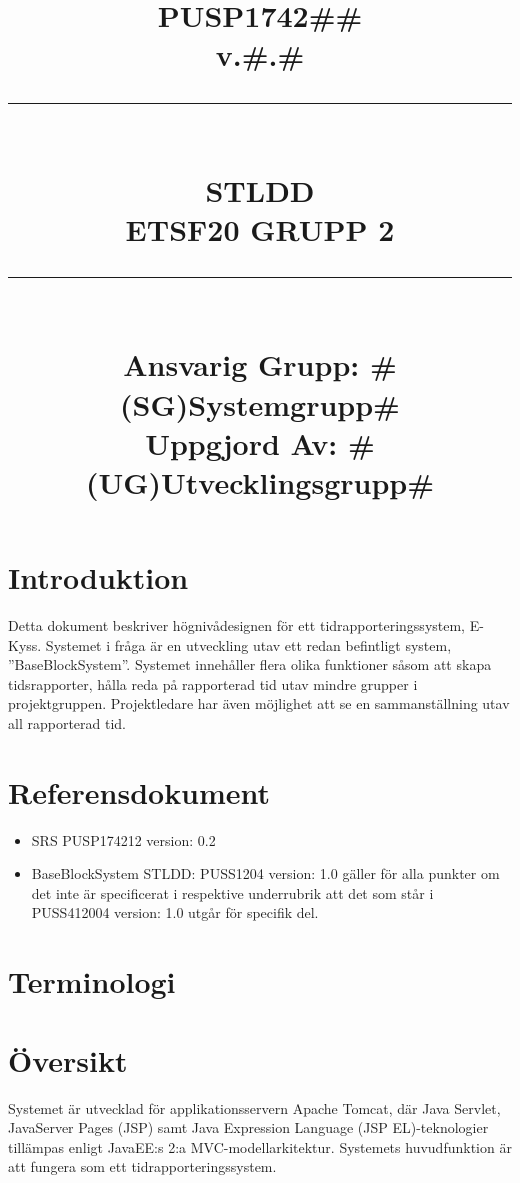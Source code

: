 \documentclass[paper=a4, fontsize=11pt,twoside]{article}
\title{
		\documentNumber{#1}																		
		\documentVersion{#2}																			
		\HRule{0.5pt} \\ %
		\LARGE \textbf{\uppercase{#3}} \\
		\large \textbf{\uppercase{ETSF20 Grupp 2}} 
		\HRule{2pt} \\ [1.5cm]    
		\normalsize            
		\documentResponsible{#4} \\ 
		\documentCreator{#5}  
	}
\newcommand{\HRule}[1]{\rule{\linewidth}{#1}}
\newcommand{\documentNumber}[1]{\centering PUSP1742#1 \\[1.0cm]}
\newcommand{\documentVersion}[1]{\centering \small{v.#1} \\[1.0cm]}
\newcommand{\documentResponsible}[1]{\centering  Ansvarig Grupp: #1}
\newcommand{\documentCreator}[1]{\centering Uppgjord Av: #1}
\newcommand{\grouptitlepage}[5]{ 
	\title{
		\documentNumber{#1}																		
		\documentVersion{#2}																			
		\HRule{0.5pt} \\ %
		\LARGE \textbf{\uppercase{#3}} \\
		\large \textbf{\uppercase{ETSF20 Grupp 2}} 
		\HRule{2pt} \\ [1.5cm]    
		\normalsize            
		\documentResponsible{#4} \\ 
		\documentCreator{#5}  
	}																							
	\maketitle																					
	\thispagestyle{empty} 																		
	\newpage 
}
\begin{document}
\grouptitlepage
{\#\#}
{\#.\#}
{STLDD}
{\#(SG)Systemgrupp\#}
{\#(UG)Utvecklingsgrupp\#}
\tableofcontents

\section{Introduktion}
Detta dokument beskriver högnivådesignen för ett tidrapporteringssystem, E-Kyss. Systemet i fråga är en utveckling utav ett redan befintligt system, ''BaseBlockSystem''. Systemet innehåller flera olika funktioner såsom att skapa tidsrapporter, hålla reda på rapporterad tid utav mindre grupper i projektgruppen. Projektledare har även möjlighet att se en sammanställning utav all rapporterad tid. 

\section{Referensdokument}
\begin{itemize}
\item SRS PUSP174212 version: 0.2
\item BaseBlockSystem STLDD: PUSS1204 version: 1.0 gäller för alla punkter om det inte är specificerat i respektive underrubrik att det som står i PUSS412004 version: 1.0 utgår för specifik del.
\end{itemize}
\section{Terminologi}

\newpage
\section{Översikt}
Systemet är utvecklad för applikationsservern Apache Tomcat, där Java Servlet, JavaServer Pages (JSP) samt Java Expression Language (JSP EL)-teknologier tillämpas enligt JavaEE:s 2:a MVC-modellarkitektur. Systemets huvudfunktion är att fungera som ett tidrapporteringssystem.
\end{document}
